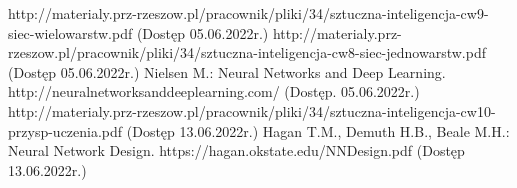 \documentclass[12pt,twoside]{article}
\begin{document}

\begin{thebibliography}{4}
	 http://materialy.prz-rzeszow.pl/pracownik/pliki/34/sztuczna-inteligencja-cw9-siec-wielowarstw.pdf (Dostęp 05.06.2022r.)
	 http://materialy.prz-rzeszow.pl/pracownik/pliki/34/sztuczna-inteligencja-cw8-siec-jednowarstw.pdf (Dostęp 05.06.2022r.)
	 Nielsen M.: Neural Networks and Deep Learning. http://neuralnetworksanddeeplearning.com/ (Dostęp. 05.06.2022r.)
	 http://materialy.prz-rzeszow.pl/pracownik/pliki/34/sztuczna-inteligencja-cw10-przysp-uczenia.pdf (Dostęp 13.06.2022r.)
	 Hagan T.M., Demuth H.B., Beale M.H.: Neural Network Design. https://hagan.okstate.edu/NNDesign.pdf (Dostęp 13.06.2022r.)
\end{thebibliography}

\clearpage
\end{document}
